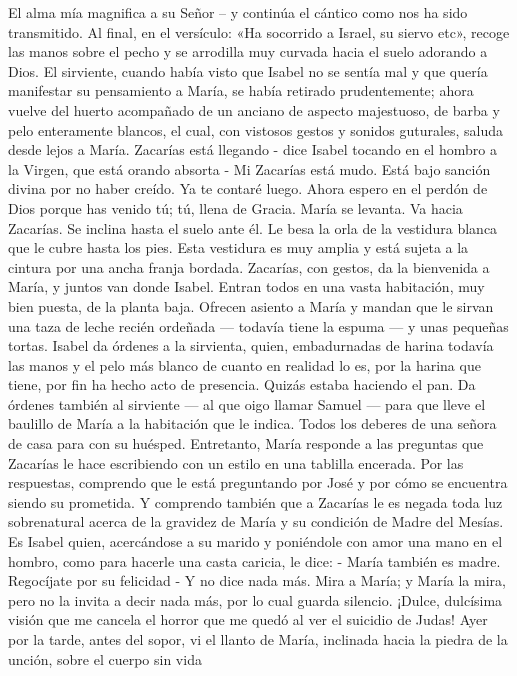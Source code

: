 \documentclass[12pt]{book} %
\begin{document}
El alma mía magnifica a su Señor – y continúa el cántico como nos ha sido transmitido. Al final, en el versículo: «Ha 
socorrido a Israel, su siervo etc», recoge las manos sobre el pecho y se arrodilla muy curvada hacia el suelo adorando a Dios. 
El sirviente, cuando había visto que Isabel no se sentía mal y que quería manifestar su pensamiento a María, se había retirado prudentemente; ahora vuelve del huerto acompañado de un anciano de aspecto majestuoso, de barba y pelo enteramente blancos, el cual, con vistosos gestos y sonidos guturales, saluda desde lejos a María. 
Zacarías está llegando - dice Isabel tocando en el hombro a la Virgen, que está orando absorta - Mi Zacarías está mudo. Está bajo sanción divina por no haber creído. Ya te contaré luego. Ahora espero en el perdón de Dios porque has venido tú; tú, llena de Gracia. 
María se levanta. Va hacia Zacarías. Se inclina hasta el suelo ante él. Le besa la orla de la vestidura blanca que le cubre 
hasta los pies. Esta vestidura es muy amplia y está sujeta a la cintura por una ancha franja bordada. 
Zacarías, con gestos, da la bienvenida a María, y juntos van donde Isabel. Entran todos en una vasta habitación, muy bien puesta, de la planta baja. Ofrecen asiento a María y mandan que le sirvan una taza de leche recién ordeñada — todavía tiene la espuma — y unas pequeñas tortas. 
Isabel da órdenes a la sirvienta, quien, embadurnadas de harina todavía las manos y el pelo más blanco de cuanto en 
realidad lo es, por la harina que tiene, por fin ha hecho acto de presencia. Quizás estaba haciendo el pan. Da órdenes también al sirviente — al que oigo llamar Samuel — para que lleve el baulillo de María a la habitación que le indica. Todos los deberes de una señora de casa para con su huésped. 
Entretanto, María responde a las preguntas que Zacarías le hace escribiendo con un estilo en una tablilla encerada. Por las respuestas, comprendo que le está preguntando por José y por cómo se encuentra siendo su prometida. Y comprendo también que a Zacarías le es negada toda luz sobrenatural acerca de la gravidez de María y su condición de Madre del Mesías. Es Isabel quien, acercándose a su marido y poniéndole con amor una mano en el hombro, como para hacerle una casta caricia, le dice: 
- María también es madre. Regocíjate por su felicidad - Y no dice nada más. Mira a María; y María la mira, pero no la 
invita a decir nada más, por lo cual guarda silencio. 
¡Dulce, dulcísima visión que me cancela el horror que me quedó al ver el suicidio de Judas! 
Ayer por la tarde, antes del sopor, vi el llanto de María, inclinada hacia la piedra de la unción, sobre el cuerpo sin vida 
\end{document}
